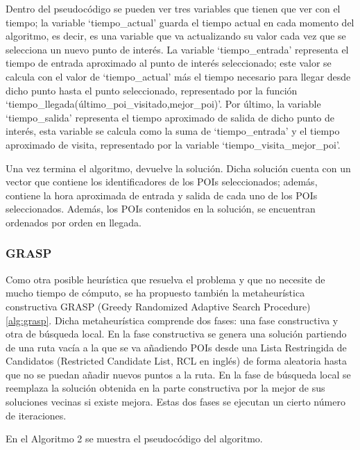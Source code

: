 Dentro del pseudocódigo se pueden ver tres variables que tienen que ver con el tiempo; la variable \enquote*{tiempo\_actual} guarda el tiempo actual en cada momento del algoritmo, es decir, es una variable que va actualizando su valor cada vez que se selecciona un nuevo punto de interés. La variable \enquote*{tiempo\_entrada} representa el tiempo de entrada aproximado al punto de interés seleccionado; este valor se calcula con el valor de \enquote*{tiempo\_actual} más el tiempo necesario para llegar desde dicho punto hasta el punto seleccionado, representado por la función \enquote*{tiempo\_llegada(último\_poi\_visitado,mejor\_poi)}. Por último, la variable \enquote*{tiempo\_salida} representa el tiempo aproximado de salida de dicho punto de interés, esta variable se calcula como la suma de \enquote*{tiempo\_entrada} y el tiempo aproximado de visita, representado por la variable  \enquote*{tiempo\_visita\_mejor\_poi}.\newline

Una vez termina el algoritmo, devuelve la solución. Dicha solución cuenta con un vector que contiene los identificadores de los POIs seleccionados; además, contiene la hora aproximada de entrada y salida de cada uno de los POIs seleccionados. Además, los POIs contenidos en la solución, se encuentran ordenados por orden en llegada.\newline

\subsubsection{GRASP}
Como otra posible heurística que resuelva el problema y que no necesite de mucho tiempo de cómputo, se ha propuesto también la metaheurística constructiva GRASP (Greedy Randomized Adaptive Search Procedure) \ref{alg:grasp}. Dicha metaheurística comprende dos fases: una fase constructiva y otra de búsqueda local. En la fase constructiva se genera una solución partiendo de una ruta vacía a la que se va añadiendo POIs desde una Lista Restringida de Candidatos (Restricted Candidate List, RCL en inglés) de forma aleatoria hasta que no se puedan añadir nuevos puntos a la ruta. En la fase de búsqueda local se reemplaza la solución obtenida en la parte constructiva por la mejor de sus soluciones vecinas si existe mejora. Estas dos fases se ejecutan un cierto número de iteraciones.\newline

En el Algoritmo 2 se muestra el pseudocódigo del algoritmo.
\newpage

